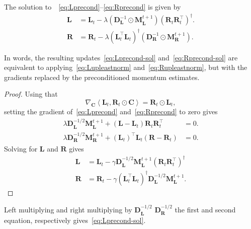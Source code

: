 \documentclass[11pt]{article}
\newcommand{\mat}[1]{\bm{#1}}
\newcommand{\mC}{\mat{C}}
\newcommand{\mD}{\mat{D}}
\newcommand{\mL}{\mat{L}}
\newcommand{\mM}{\mat{M}}
\newcommand{\mR}{\mat{R}}
\newcommand{\dotprod}[1]{\left< #1\right>}
\begin{document}
\begin{lemma} \label{lem:LR-precond}
    The solution to~~\eqref{eq:Lprecond}--\eqref{eq:Rprecond} is given by
    \begin{align}
        \mL &= \mL_t -\lambda(\mD_{\mL}^{-1}\odot\mM_{\mL}^{t+1})(\mR_t\mR_t^\top )^{\dagger}.  \label{eq:Lprecond-sol}  \\
        \mR &= \mR_t- \lambda (\mL_t^\top\mL_t)^{\dagger}(\mD_{\mR}^{-1}\odot \mM_{\mR}^{t+1}). \label{eq:Rprecond-sol} 
    \end{align}
\end{lemma}
In words, the resulting updates~\eqref{eq:Lprecond-sol} and~\eqref{eq:Rprecond-sol} are equivalent to applying~\eqref{eq:Lupleastnorm} and~\eqref{eq:Rupleastnorm}, but with the gradients replaced by the preconditioned momentum estimates.
\begin{proof}
    Using that
    \[ \nabla_{\mC} \dotprod{\mL_t, \mR_t \odot \mC} = \mR_t  \odot \mL_t, \]
    setting the gradient of~\eqref{eq:Lprecond} and~\eqref{eq:Rprecond}  to zero gives
      \begin{align*}
          \lambda \mD_{\mL}^{-1/2}\mM_{\mL}^{t+1}  + (\mL-\mL_t) \mR_t\mR_t^\top &=0. \\
          \lambda \mD_{\mR}^{-1/2}\mM_{\mR}^{t+1}  + (\mL_t)^{\top} \mL_t(\mR-\mR_t)  &=0.
      \end{align*} 
      Solving for $\mL$ and $\mR$ gives
      \begin{align*}
      \mL &= \mL_t -\gamma\mD_{\mL}^{-1/2}\mM_{\mL}^{t+1}(\mR_t\mR_t^\top )^{\dagger}\\
       \mR &= \mR_t -\gamma(\mL_t^\top \mL_t)^{\dagger} \mD_{\mL}^{-1/2}\mM_{\mL}^{t+1}.
      \end{align*}
\end{proof}
Left multiplying and right multiplying by $\mD_{\mL}^{-1/2} $  $\mD_{\mR}^{-1/2} $ the first and second equation, respectively gives~\eqref{eq:Lprecond-sol}.
\end{document}
